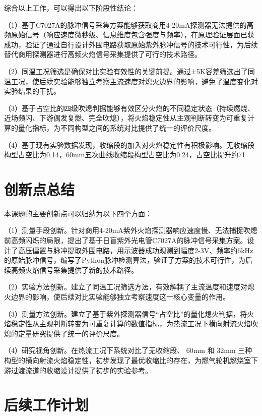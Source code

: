 综合以上工作，可以得出以下阶段性结论：

（1）基于C7027A的脉冲信号采集方案能够获取商用4-20mA探测器无法提供的高频原始信号（响应速度微秒级、信息维度包含强度与频率），在原理验证层面已获成功，验证了通过自行设计外围电路获取原始紫外脉冲信号的技术可行性，为后续替代商用探测器进行高频火焰信号采集提供了可行的技术路径。

（2）同温工况筛选是确保对比实验有效性的关键前提。通过±5K容差筛选出了同温工况，使后续实验能够独立考察主流速度对熄火边界的影响，避免了温度变化对实验结果的干扰。

（3）基于占空比的四级吹熄判据能够有效区分火焰的不同稳定状态（持续燃烧、近场频闪、下游偶发复燃、完全吹熄），将火焰稳定性从主观判断转变为可重复计算的量化指标，为不同构型之间的系统对比提供了统一的评价尺度。

（4）基于现有实验数据发现，收缩段的加入对火焰稳定性有积极影响。无收缩段构型占空比为0.14，60mm五次曲线收缩段构型占空比为0.24，占空比提升约71%

\section{创新点总结}

本课题的主要创新点可以归纳为以下四个方面：

（1）测量手段创新。针对商用4-20mA紫外火焰探测器响应速度慢、无法捕捉吹熄前高频闪烁的局限，提出了基于日盲紫外光电管C7027A的脉冲信号采集方案。设计了高压偏置与脉冲提取外围电路，用示波器成功观测到幅度2-3V、频率约6kHz的原始脉冲信号，编写了Python脉冲检测算法，验证了方案的技术可行性，为后续高频火焰信号采集提供了新的技术路径。

（2）实验方法创新。建立了同温工况筛选方法，有效解耦了主流温度和速度对熄火边界的影响，使后续对比实验能够独立考察速度这一核心变量的作用。

（3）测量方法创新。建立了基于紫外探测器信号“占空比”的量化熄火判据，将火焰稳定性从主观判断转变为可重复计算的数值指标，为热流工况下横向射流火焰吹熄的定量研究提供了统一的评价尺度。

（4）研究视角创新。在热流工况下系统对比了无收缩段、 \(60\mathrm{mm}\) 和 \(32\mathrm{mm}\) 三种构型的横向射流火焰稳定性，初步发现了最优收缩比的存在，为燃气轮机燃烧室下游过渡流道的收缩设计提供了初步的实验参考。

\section{后续工作计划}

